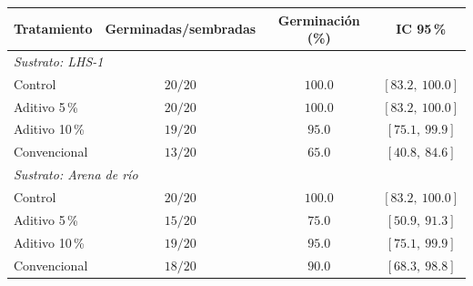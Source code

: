 \begin{tabular}{lccc}
\hline\hline
\textbf{Tratamiento} & \textbf{Germinadas/sembradas} & \textbf{Germinaci\'on (\%)} & \textbf{IC 95\,\%} \\
\hline
\multicolumn{4}{l}{\textit{Sustrato: LHS-1}} \\
Control & $20/20$ & $100.0$ & $[83.2,\ 100.0]$ \\
Aditivo 5\,\% & $20/20$ & $100.0$ & $[83.2,\ 100.0]$ \\
Aditivo 10\,\% & $19/20$ & $95.0$ & $[75.1,\ 99.9]$ \\
Convencional & $13/20$ & $65.0$ & $[40.8,\ 84.6]$ \\
\hline
\multicolumn{4}{l}{\textit{Sustrato: Arena de r\'io}} \\
Control & $20/20$ & $100.0$ & $[83.2,\ 100.0]$ \\
Aditivo 5\,\% & $15/20$ & $75.0$ & $[50.9,\ 91.3]$ \\
Aditivo 10\,\% & $19/20$ & $95.0$ & $[75.1,\ 99.9]$ \\
Convencional & $18/20$ & $90.0$ & $[68.3,\ 98.8]$ \\
\hline
\end{tabular}
